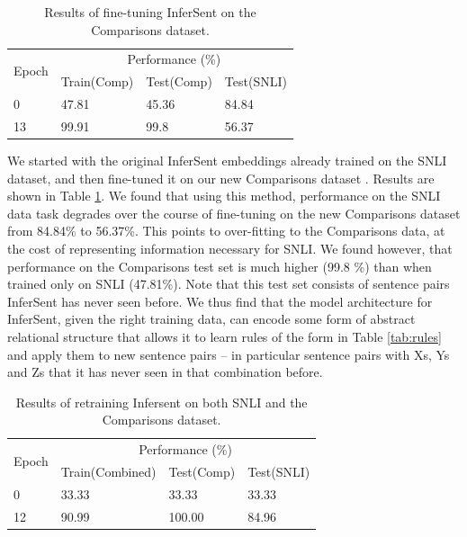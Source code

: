 \begin{table}[htb]
  \begin{tabular}{llll}
  \toprule
     \multirow{ 2}{*}{Epoch} &
      \multicolumn{3}{c}{Performance (\%)} \\
       & Train(Comp) & Test(Comp) & Test(SNLI)\\
    \midrule
    0 & 47.81 & 45.36 & 84.84\\
    13 & 99.91 & 99.8 & 56.37\\
    \bottomrule
  \end{tabular}
 \caption{Results of fine-tuning InferSent on the Comparisons dataset.}
  \label{tab:finetuning}
\end{table}

We started with the original InferSent embeddings already trained on the SNLI dataset, and then fine-tuned it on our new Comparisons dataset \citep[using the same protocols used in][to train InferSent]{Conneau:2017uf}. Results are shown in Table \ref{tab:finetuning}. We found that using this method, performance on the SNLI data task degrades over the course of fine-tuning on the new Comparisons dataset from 84.84\% to 56.37\%. This points to over-fitting to the Comparisons data, at the cost of representing information necessary for SNLI. We found however, that performance on the Comparisons test set is much higher (99.8 \%) than when trained only on SNLI (47.81\%). Note that this test set consists of sentence pairs InferSent has never seen before. We thus find that the model architecture for InferSent, given the right training data, can encode some form of abstract relational structure that allows it to learn rules of the form in Table \ref{tab:rules} and apply them to new sentence pairs -- in particular sentence pairs with Xs, Ys and Zs that it has never seen in that combination before.


\begin{table}[htb]
  \begin{tabular}{llll}
  \toprule
     \multirow{ 2}{*}{Epoch} &
      \multicolumn{3}{c}{Performance (\%)} \\
       & Train(Combined) & Test(Comp) & Test(SNLI)\\
    \midrule
    0 & 33.33 & 33.33 & 33.33\\
    12 & 90.99  & 100.00 & 84.96\\
    \bottomrule
  \end{tabular}
 \caption{Results of retraining Infersent on both SNLI and the Comparisons dataset.}
  \label{tab:retraining}
\end{table}

